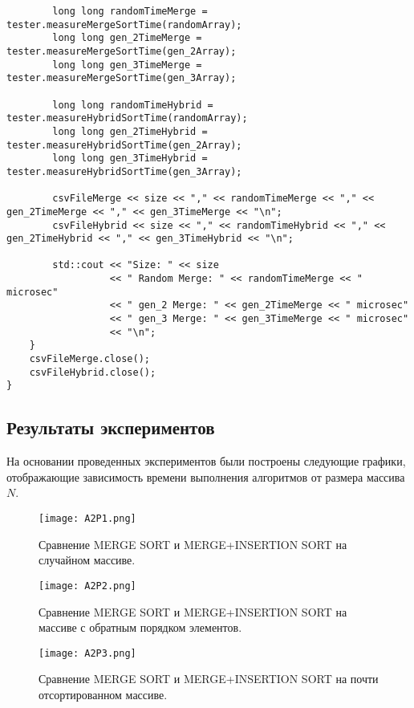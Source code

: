 \documentclass{article}
\begin{document}
\begin{lstlisting}
        long long randomTimeMerge = tester.measureMergeSortTime(randomArray);
        long long gen_2TimeMerge = tester.measureMergeSortTime(gen_2Array);
        long long gen_3TimeMerge = tester.measureMergeSortTime(gen_3Array);

        long long randomTimeHybrid = tester.measureHybridSortTime(randomArray);
        long long gen_2TimeHybrid = tester.measureHybridSortTime(gen_2Array);
        long long gen_3TimeHybrid = tester.measureHybridSortTime(gen_3Array);

        csvFileMerge << size << "," << randomTimeMerge << "," << gen_2TimeMerge << "," << gen_3TimeMerge << "\n";
        csvFileHybrid << size << "," << randomTimeHybrid << "," << gen_2TimeHybrid << "," << gen_3TimeHybrid << "\n";

        std::cout << "Size: " << size
                  << " Random Merge: " << randomTimeMerge << " microsec"
                  << " gen_2 Merge: " << gen_2TimeMerge << " microsec"
                  << " gen_3 Merge: " << gen_3TimeMerge << " microsec"
                  << "\n";
    }
    csvFileMerge.close();
    csvFileHybrid.close();
}
\end{lstlisting}

\subsection{Результаты экспериментов}

На основании проведенных экспериментов были построены следующие графики, отображающие зависимость времени выполнения алгоритмов от размера массива \(N\).

\begin{figure}[h!]
    \centering
    \texttt{[image: A2P1.png]}
    \caption{Сравнение MERGE SORT и MERGE+INSERTION SORT на случайном массиве.}
\end{figure}

\begin{figure}[h!]
    \centering
    \texttt{[image: A2P2.png]}
    \caption{Сравнение MERGE SORT и MERGE+INSERTION SORT на массиве с обратным порядком элементов.}
\end{figure}

\begin{figure}[h!]
    \centering
    \texttt{[image: A2P3.png]}
    \caption{Сравнение MERGE SORT и MERGE+INSERTION SORT на почти отсортированном массиве.}
\end{figure}
\end{document}
